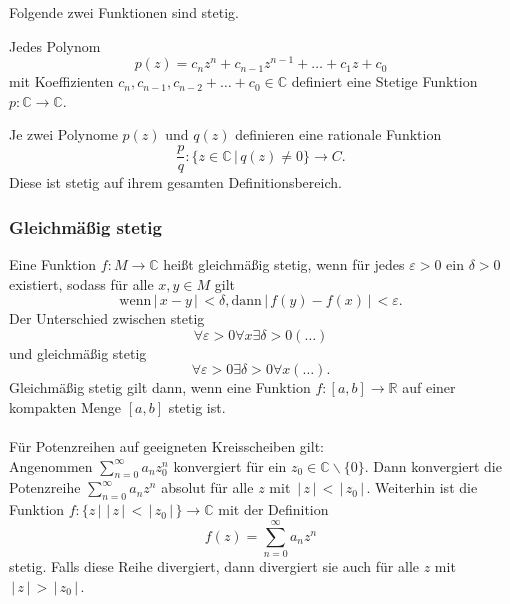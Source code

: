 \documentclass[a4paper,12pt]{article}
\numberwithin{equation}{section}
\begin{document}
Folgende zwei Funktionen sind stetig.
\begin{center}
        Jedes Polynom
        \[ 
                p\left(z\right)=c_nz^{n}+c _{n-1}z^{n-1}+\hdots+c_1z+c_0
        \] 
        mit Koeffizienten $c_n,c _{n-1},c _{n-2}+\hdots+c_0 \in \mathbb{C}$ definiert eine Stetige Funktion $p:\mathbb{C}\rightarrow \mathbb{C}$.
\end{center}
\begin{center}
        Je zwei Polynome $p\left(z\right)$ und $q\left(z\right)$ definieren eine rationale Funktion
        \[ 
                \dfrac{p}{q}:\{z \in \mathbb{C}\,|\, q\left(z\right)\neq 0\}\rightarrow C
        .\] 
        Diese ist stetig auf ihrem gesamten Definitionsbereich.
\end{center}

\subsubsection{Gleichmäßig stetig}
Eine Funktion $f:M\rightarrow \mathbb{C}$ heißt gleichmäßig stetig, wenn für jedes $\varepsilon >0$ ein $\delta >0$ existiert, sodass für alle $x,y \in M$ gilt
\[ 
        \text{wenn}\,|\, x-y\,|\, <\delta ,\text{dann}\,|\, f\left(y\right)-f\left(x\right)\,|\, <\varepsilon 
.\] 
Der Unterschied zwischen stetig
\[ 
        \forall \varepsilon >0\forall x \exists \delta >0\left(\hdots\right)
\] 
und gleichmäßig stetig
\[ 
        \forall \varepsilon >0\exists \delta >0\forall x\left(\hdots\right)
.\] 
Gleichmäßig stetig gilt dann, wenn eine Funktion $f:[a,b]\rightarrow \mathbb{R}$ auf einer kompakten Menge $[a,b]$ stetig ist.\\\\
Für Potenzreihen auf geeigneten Kreisscheiben gilt:\\
Angenommen $\sum_{n=0}^{\infty}a_nz^n_0$ konvergiert für ein $z_0 \in \mathbb{C}\backslash \{0\}$. Dann konvergiert die Potenzreihe $\sum_{n=0}^{\infty}a_nz^n$ absolut für alle $z$ mit $\,|\, z\,|\, <\,|\, z_0\,|\, $. Weiterhin ist die Funktion $f:\{z\,|\, \,|\, z\,|\, <\,|\, z_0\,|\, \}\rightarrow \mathbb{C}$ mit der Definition
\[ 
        f\left(z\right)=\sum_{n=0}^{\infty}a_nz^n
\] 
stetig. Falls diese Reihe divergiert, dann divergiert sie auch für alle $z$ mit $\,|\, z\,|\, >\,|\, z_0\,|\, $.
\end{document}
